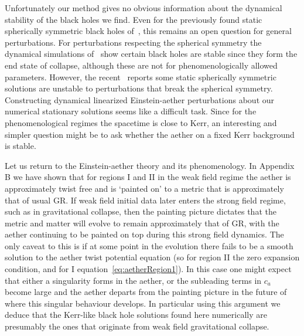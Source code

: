 \documentclass[12pt]{article}
\numberwithin{equation}{section}
\begin{document}
Unfortunately our method gives no obvious information about the dynamical stability of the black holes we find. Even for the previously found static spherically symmetric black holes of~\cite{Eling:2006ec,Barausse:2011pu}, this remains an open question for general perturbations.  For perturbations respecting the spherical symmetry the  dynamical simulations of~\cite{Garfinkle:2007bk} show certain black holes  are stable since they form the end state of collapse, although these are not for phenomenologically allowed parameters. However, the recent~\cite{Tsujikawa:2021typ} reports some static spherically symmetric solutions are unstable to perturbations that break the spherical symmetry. Constructing dynamical linearized Einstein-aether perturbations about our numerical stationary solutions seems like a difficult task. Since for the phenomenological regimes the spacetime is close to Kerr, an interesting and simpler question might be to ask whether the aether on a fixed Kerr background is stable.



Let us return to the Einstein-aether theory and its phenomenology.
In Appendix B we have shown
that for regions I and II in the weak field regime the aether is approximately twist free and is `painted on' to a metric that is approximately that of usual GR. 
If weak field initial data later enters the strong field regime, such as in gravitational collapse, then the painting picture
dictates that the metric and matter will evolve to remain approximately that of GR, with the aether continuing to be painted on top during this strong field dynamics. 
The only caveat to this is if at some point in the evolution there fails to be a smooth solution to the aether twist potential equation (so for region II the zero expansion condition, and for I equation~\eqref{eq:aetherRegion1}). In this case one might expect that either a singularity forms in the aether, or the subleading terms in $c_a$ become large and the aether departs from the painting picture in the future of where this singular behaviour develops.
In particular using this argument we deduce that the Kerr-like black hole solutions found here numerically are presumably the ones that originate from weak field gravitational collapse.
\end{document}
